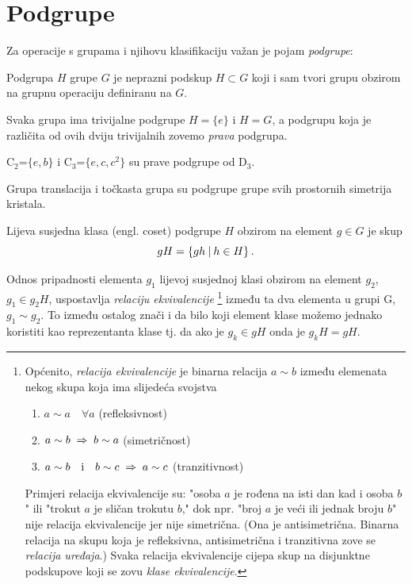 \section{Podgrupe}
\label{sec:podgrupe}

Za operacije s grupama i njihovu klasifikaciju važan je pojam \emph{podgrupe}:
\begin{definicija}[Podgrupa]
Podgrupa $H$ grupe $G$ je neprazni podskup $H\subset G$ koji i sam
tvori grupu obzirom na grupnu operaciju definiranu na $G$.
\end{definicija}

Svaka grupa ima trivijalne podgrupe $H=\{e\}$ i $H=G$, a
podgrupu koja je različita od ovih dviju trivijalnih
zovemo \emph{prava} podgrupa.

\begin{primjer} \label{th:c2c3}
C$_2$=$\{e, b\}$ i C$_3$=$\{e, c, c^2\}$ su prave podgrupe od D$_3$.
\end{primjer}

\begin{primjer}
Grupa translacija i točkasta grupa su podgrupe grupe svih prostornih
simetrija kristala.
\end{primjer}

\begin{definicija}
Lijeva susjedna klasa (engl. coset) podgrupe $H$ obzirom na element
$g\in G$ je skup
\begin{displaymath}
     gH=\{gh \: | \: h\in H\} \,.
\end{displaymath}
\end{definicija}

Odnos pripadnosti elementa $g_1$ lijevoj susjednoj klasi obzirom na element $g_2$,  
$g_1 \in g_2 H$, uspostavlja \emph{relaciju ekvivalencije}%
\footnote{\label{fn:ekviv} 
Općenito, \emph{relacija ekvivalencije} je binarna relacija $a\sim b$ između
elemenata nekog
skupa koja ima slijedeća svojstva
\begin{enumerate}[itemsep=1pt, topsep=1.0ex]
\item $a\sim a \quad \forall a$ \qquad (refleksivnost)
\item $a\sim b \;\Rightarrow\; b\sim a$   \qquad (simetričnost)
\item $a\sim b \quad \textrm{i}\quad  b\sim c \;\Rightarrow\; a\sim c$  \qquad (tranzitivnost)
\end{enumerate}
Primjeri relacija ekvivalencije su: "osoba $a$ je rođena na isti dan kad i osoba $b$"
ili "trokut $a$ je sličan trokutu $b$," dok npr. "broj $a$ je veći ili jednak
broju $b$" nije relacija ekvivalencije jer nije simetrična.
(Ona je antisimetrična. Binarna relacija na skupu koja je refleksivna, antisimetrična
i tranzitivna zove se \emph{relacija uređaja}.)
Svaka relacija ekvivalencije cijepa skup na disjunktne podskupove 
koji se zovu \emph{klase ekvivalencije}.} između ta dva elementa u grupi G, $g_1 \sim g_2$.
To između ostalog znači i da bilo koji element klase možemo jednako koristiti
kao reprezentanta klase tj. da ako je $g_k \in gH$ onda je $g_{k}H = gH$.

